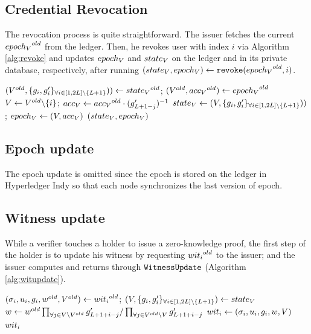 \documentclass{article}
\begin{document}
\subsection{Credential Revocation}
The revocation process is quite straightforward. The issuer fetches the current ${epoch_{V} }^{old}$ from the ledger. Then, he revokes user with index $i$ via Algorithm \ref{alg:revoke} and updates $epoch_{V} $ and $state_{V}$ on the ledger and in its private database, respectively, after running $(state_{V} ,epoch_{V} )\leftarrow \mathtt{revoke}({epoch_{V}}^{old}, i)$. 

\begin{algorithm}
\caption{$\mt{revoke}(\old{\stv}, \old{\epv }, i)$}
\label{alg:revoke}
\begin{algorithmic}
	\State $({V}^{old}, \{{g_{i}, g'_{i}}\}_{\forall i\in [{1, {2L}}] \backslash \{{L + 1}\}}) )\leftarrow {state_{V}}^{old}$; $({V}^{old}, {acc_{V} }^{old})\leftarrow {epoch_{V}}^{old}$
	\State $V \leftarrow {V}^{old} \backslash \{i\}$; $acc_{V} \leftarrow {acc_{V}}^{old}\cdot (g'_{L + 1 - j})^{-1}$
	\State $state_{V} \leftarrow (V, \{{g_{i}, g'_{i}}\}_{\forall i\in [{1, {2L}}] \backslash \{{L + 1}\}}))$;  $epoch_{V} \leftarrow (V, acc_{V} )$
	\State \Return $(state_{V} ,epoch_{V} )$
\end{algorithmic}
\end{algorithm}

\subsection{Epoch update}
The epoch update is omitted since the epoch is stored on the ledger in Hyperledger Indy so that each node synchronizes the last version of epoch.

\subsection{Witness update}
While a verifier touches a holder to issue a zero-knowledge proof, the first step of the holder is to update his witness by requesting ${wit_{i} }^{old}$ to the issuer; and the issuer computes and returns through $\mathtt{WitnessUpdate}$ (Algorithm \ref{alg:witupdate}).

\begin{algorithm}
\caption{$\mt{updateWitness}(\old{\witi }, \stv)$}
\label{alg:witupdate}
\begin{algorithmic}
	\State $(\sigma _{i}, u_{i}, g_{i}, {w}^{old}, {V}^{old})\leftarrow {wit_{i}}^{old}$; $(V, \{{g_{i}, g'_{i}}\}_{\forall i\in [{1, {2L}}] \backslash \{{L + 1}\}}) \leftarrow state_{V}$
	\State $w \leftarrow {w}^{old} \prod _{\forall j\in V \backslash {V}^{old}}g'_{L + 1 + i - j} / \prod _{\forall j\in {V}^{old} \backslash V}g'_{L + 1 + i - j} $
	\State $wit_{i} \leftarrow (\sigma _{i}, u_{i}, g_{i}, w, V)$
	\State \Return $wit_{i} $
\end{algorithmic}
\end{algorithm}
\end{document}
